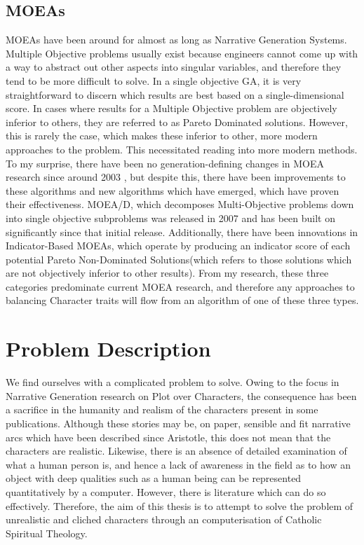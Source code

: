 \documentclass[12pt]{article}
\begin{document}
\subsection{MOEAs}
MOEAs have been around for almost as long as Narrative Generation Systems. Multiple Objective problems usually exist because engineers cannot come up with a way to abstract out other aspects into singular variables, and therefore they tend to be more difficult to solve. In a single objective GA, it is very straightforward to discern which results are best based on a single-dimensional score. In cases where results for a Multiple Objective problem are objectively inferior to others, they are referred to as Pareto Dominated solutions. However, this is rarely the case, which makes these inferior to other, more modern approaches to the problem\cite{AchievementScalarazingIndicatorBased}. This necessitated reading into more modern methods. To my surprise, there have been no generation-defining changes in MOEA research since around 2003 \cite{MOEASurvey1}, but despite this, there have been improvements to these algorithms and new algorithms which have emerged, which have proven their effectiveness. MOEA/D, which decomposes Multi-Objective problems down into single objective subproblems \cite{MOEAD} was released in 2007 and has been built on significantly since that initial release. Additionally, there have been innovations in Indicator-Based MOEAs, which operate by producing an indicator score of each potential Pareto Non-Dominated Solutions(which refers to those solutions which are not objectively inferior to other results). From my research, these three categories predominate current MOEA research, and therefore any approaches to balancing Character traits will flow from an algorithm of one of these three types.

\section{Problem Description}
We find ourselves with a complicated problem to solve. Owing to the focus in Narrative Generation research on Plot over Characters, the consequence has been a sacrifice in the humanity and realism of the characters present in some publications. Although these stories may be, on paper, sensible and fit narrative arcs which have been described since Aristotle, this does not mean that the characters are realistic. Likewise, there is an absence of detailed examination of what a human person is, and hence a lack of awareness in the field as to how an object with deep qualities such as a human being can be represented quantitatively by a computer. However, there is literature which can do so effectively. Therefore, the aim of this thesis is to attempt to solve the problem of unrealistic and cliched characters through an computerisation of Catholic Spiritual Theology.
\end{document}
